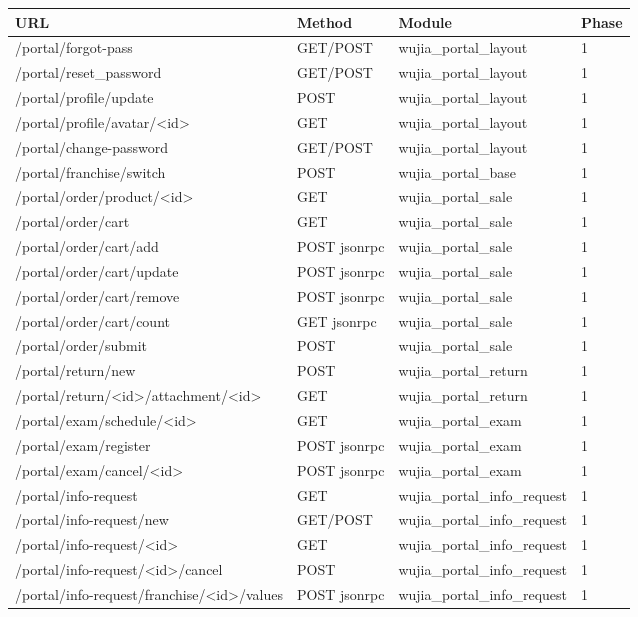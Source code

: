\begin{tabular}{p{4.5cm}lll}
\toprule
\textbf{URL} & \textbf{Method} & \textbf{Module} & \textbf{Phase} \\
\midrule
/portal/forgot-pass & GET/POST & wujia\_portal\_layout & 1 \\
/portal/reset\_password & GET/POST & wujia\_portal\_layout & 1 \\
/portal/profile/update & POST & wujia\_portal\_layout & 1 \\
/portal/profile/avatar/<id> & GET & wujia\_portal\_layout & 1 \\
/portal/change-password & GET/POST & wujia\_portal\_layout & 1 \\
/portal/franchise/switch & POST & wujia\_portal\_base & 1 \\
/portal/order/product/<id> & GET & wujia\_portal\_sale & 1 \\
/portal/order/cart & GET & wujia\_portal\_sale & 1 \\
/portal/order/cart/add & POST jsonrpc & wujia\_portal\_sale & 1 \\
/portal/order/cart/update & POST jsonrpc & wujia\_portal\_sale & 1 \\
/portal/order/cart/remove & POST jsonrpc & wujia\_portal\_sale & 1 \\
/portal/order/cart/count & GET jsonrpc & wujia\_portal\_sale & 1 \\
/portal/order/submit & POST & wujia\_portal\_sale & 1 \\
/portal/return/new & POST & wujia\_portal\_return & 1 \\
/portal/return/<id>/attachment/<id> & GET & wujia\_portal\_return & 1 \\
/portal/exam/schedule/<id> & GET & wujia\_portal\_exam & 1 \\
/portal/exam/register & POST jsonrpc & wujia\_portal\_exam & 1 \\
/portal/exam/cancel/<id> & POST jsonrpc & wujia\_portal\_exam & 1 \\
/portal/info-request & GET & wujia\_portal\_info\_request & 1 \\
/portal/info-request/new & GET/POST & wujia\_portal\_info\_request & 1 \\
/portal/info-request/<id> & GET & wujia\_portal\_info\_request & 1 \\
/portal/info-request/<id>/cancel & POST & wujia\_portal\_info\_request & 1 \\
/portal/info-request/franchise/<id>/values & POST jsonrpc & wujia\_portal\_info\_request & 1 \\

\end{tabular}
